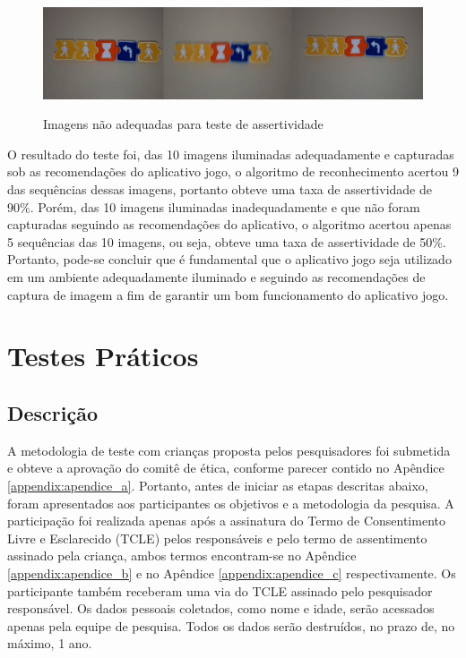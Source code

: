 \begin{figure}[H]
    \caption{Imagens não adequadas para teste de assertividade}
    \centering
    \includegraphics[width=15cm]{Imagens/Cap5/tta_ruim.PNG}
    \label{figura:tta_ruim}
\end{figure}

O resultado do teste foi, das 10 imagens iluminadas adequadamente e capturadas sob as recomendações do aplicativo jogo, o algoritmo de reconhecimento acertou 9 das sequências dessas imagens, portanto obteve uma taxa de assertividade de 90\%. Porém, das 10 imagens iluminadas inadequadamente e que não foram capturadas seguindo as recomendações do aplicativo, o algoritmo acertou apenas 5 sequências das 10 imagens, ou seja, obteve uma taxa de assertividade de 50\%. Portanto, pode-se concluir que é fundamental que o aplicativo jogo seja utilizado em um ambiente adequadamente iluminado e seguindo as recomendações de captura de imagem a fim de garantir um bom funcionamento do aplicativo jogo.


\section{Testes Práticos}

\subsection{\textbf{Descrição}}


A metodologia de teste com crianças proposta pelos pesquisadores foi submetida e obteve a aprovação do comitê de ética, conforme parecer contido no Apêndice \ref{appendix:apendice_a}. Portanto, antes de iniciar as etapas descritas abaixo, foram apresentados aos participantes os objetivos e a metodologia da pesquisa. A participação foi  realizada apenas após a assinatura do Termo de Consentimento Livre e Esclarecido (TCLE) pelos responsáveis e pelo termo de assentimento assinado pela criança, ambos termos encontram-se no Apêndice \ref{appendix:apendice_b} e no Apêndice \ref{appendix:apendice_c} respectivamente. Os participante também receberam uma via do TCLE assinado pelo pesquisador responsável. Os dados pessoais coletados, como nome e idade, serão acessados apenas pela equipe de pesquisa. Todos os dados serão destruídos, no prazo de, no máximo, 1 ano.

